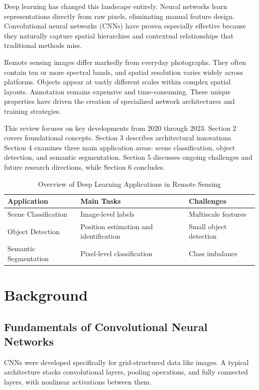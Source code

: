 \documentclass[12pt,a4paper]{article}
\begin{document}
Deep learning has changed this landscape entirely. Neural networks learn representations directly from raw pixels, eliminating manual feature design. Convolutional neural networks (CNNs) have proven especially effective because they naturally capture spatial hierarchies and contextual relationships that traditional methods miss.

Remote sensing images differ markedly from everyday photographs. They often contain ten or more spectral bands, and spatial resolution varies widely across platforms. Objects appear at vastly different scales within complex spatial layouts. Annotation remains expensive and time-consuming. These unique properties have driven the creation of specialized network architectures and training strategies.

This review focuses on key developments from 2020 through 2023. Section 2 covers foundational concepts. Section 3 describes architectural innovations. Section 4 examines three main application areas: scene classification, object detection, and semantic segmentation. Section 5 discusses ongoing challenges and future research directions, while Section 6 concludes.

\begin{table}[htbp]
\centering
\caption{Overview of Deep Learning Applications in Remote Sensing}
\label{tab:applications}
\begin{tabular}{@{}lll@{}}
\toprule
\textbf{Application} & \textbf{Main Tasks} & \textbf{Challenges} \\
\midrule
Scene Classification & Image-level labels & Multiscale features \\
Object Detection & Position estimation and identification & Small object detection \\
Semantic Segmentation & Pixel-level classification & Class imbalance \\
\bottomrule
\end{tabular}
\end{table}

\section{Background}
\label{sec:background}
\subsection{Fundamentals of Convolutional Neural Networks}
CNNs were developed specifically for grid-structured data like images. A typical architecture stacks convolutional layers, pooling operations, and fully connected layers, with nonlinear activations between them.
\end{document}
